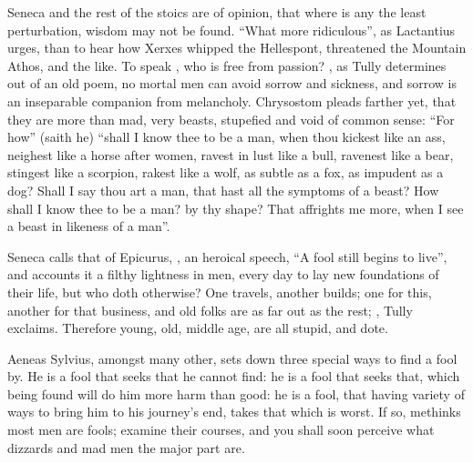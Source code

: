 
Seneca and the rest of the stoics are of opinion, that where is any the least
perturbation, wisdom may not be found. \enquote{What more ridiculous}, as
Lactantius urges, than to hear how Xerxes whipped the
Hellespont, threatened the Mountain Athos, and the like. To speak ,
who is free from passion? , as Tully determines out of an
old poem, no mortal men can avoid sorrow and sickness, and sorrow is an
inseparable companion from melancholy. Chrysostom pleads
farther yet, that they are more than mad, very beasts, stupefied and void of
common sense: \enquote{For how} (saith he) \enquote{shall I know thee to be a man, when thou
kickest like an ass, neighest like a horse after women, ravest in lust like a
bull, ravenest like a bear, stingest like a scorpion, rakest like a wolf, as
subtle as a fox, as impudent as a dog? Shall I say thou art a man, that hast
all the symptoms of a beast? How shall I know thee to be a man? by thy shape?
That affrights me more, when I see a beast in likeness of a man}.

Seneca calls that of Epicurus, , an
heroical speech, \enquote{A fool still begins to live}, and accounts it a filthy
lightness in men, every day to lay new foundations of their life, but who doth
otherwise? One travels, another builds; one for this, another for that
business, and old folks are as far out as the rest; ,
Tully exclaims. Therefore young, old, middle age, are all stupid, and dote.

Aeneas Sylvius, amongst many other, sets down three special
ways to find a fool by. He is a fool that seeks that he cannot find: he is a
fool that seeks that, which being found will do him more harm than good: he is
a fool, that having variety of ways to bring him to his journey's end, takes
that which is worst. If so, methinks most men are fools; examine their courses,
and you shall soon perceive what dizzards and mad men the major part are.

